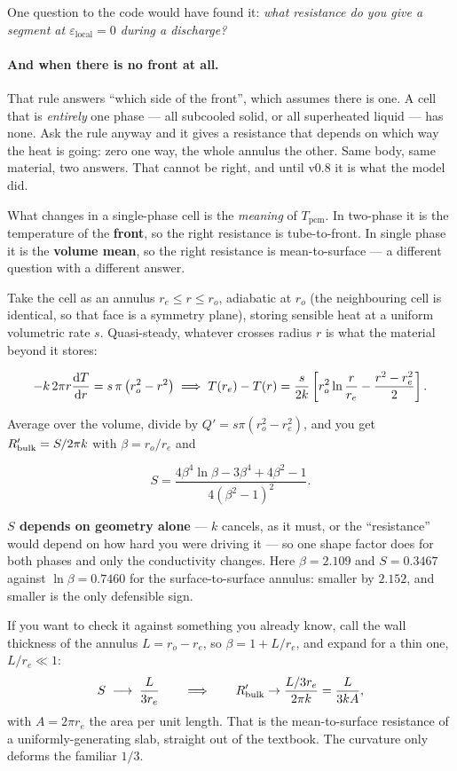 \documentclass[11pt,a4paper]{article}
\newcommand{\Tpcm}{\ensuremath{T_{\mathrm{pcm}}}}
\newcommand{\epsloc}{\ensuremath{\varepsilon_{\mathrm{local}}}}
\begin{document}
One question to the code would have found it: \emph{what resistance do you give
a segment at $\epsloc=0$ during a discharge?}

\paragraph{And when there is no front at all.}
That rule answers ``which side of the front'', which assumes there is one. A
cell that is \emph{entirely} one phase --- all subcooled solid, or all
superheated liquid --- has none. Ask the rule anyway and it gives a resistance
that depends on which way the heat is going: zero one way, the whole annulus the
other. Same body, same material, two answers. That cannot be right, and until
v0.8 it is what the model did.

What changes in a single-phase cell is the \emph{meaning} of $\Tpcm$. In
two-phase it is the temperature of the \textbf{front}, so the right resistance
is tube-to-front. In single phase it is the \textbf{volume mean}, so the right
resistance is mean-to-surface --- a different question with a different answer.

Take the cell as an annulus $r_e\le r\le r_o$, adiabatic at $r_o$ (the
neighbouring cell is identical, so that face is a symmetry plane), storing
sensible heat at a uniform volumetric rate $s$. Quasi-steady, whatever crosses
radius $r$ is what the material beyond it stores:

$$-k\,2\pi r\frac{{\rm d}T}{{\rm d}r}=s\,\pi\left(r_o^2-r^2\right)
\;\Longrightarrow\;
T(r_e)-T(r)=\frac{s}{2k}\left[r_o^2\ln\frac{r}{r_e}-\frac{r^2-r_e^2}{2}\right].$$

Average over the volume, divide by $Q'=s\pi(r_o^2-r_e^2)$, and you get
$R'_{\rm bulk}=S/2\pi k$ with $\beta=r_o/r_e$ and

$$S=\frac{4\beta^4\ln\beta-3\beta^4+4\beta^2-1}{4\left(\beta^2-1\right)^2}.$$

\textbf{$S$ depends on geometry alone} --- $k$ cancels, as it must, or the
``resistance'' would depend on how hard you were driving it --- so one shape
factor does for both phases and only the conductivity changes. Here
$\beta=2.109$ and $S=0.3467$ against $\ln\beta=0.7460$ for the
surface-to-surface annulus: smaller by $2.152$, and smaller is the only
defensible sign.

If you want to check it against something you already know, call the wall
thickness of the annulus $L=r_o-r_e$, so $\beta=1+L/r_e$, and expand for a thin
one, $L/r_e\ll1$:
$$S \;\longrightarrow\; \frac{L}{3r_e}
\qquad\Longrightarrow\qquad
R'_{\rm bulk}\to\frac{L/3r_e}{2\pi k}=\frac{L}{3kA},$$
with $A=2\pi r_e$ the area per unit length. That is the mean-to-surface
resistance of a uniformly-generating slab, straight out of the textbook. The
curvature only deforms the familiar $1/3$.
\end{document}
